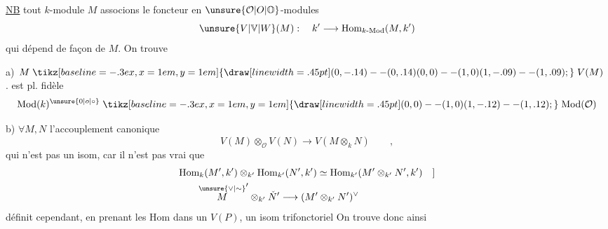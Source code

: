 
\uline{NB}  tout $k$-module $M$ associons le foncteur en $\unsure{\mathcal O|O|\mathbb O}$-modules
\[
 \unsure{V|\mathbb V|W}(M):\quad k'\longrightarrow\mathrm{Hom}_{k\text{-}\mathrm{Mod}}(M,k')
\]
qui dépend de façon  de $M$. On trouve

a) $M\mathrel{\tikz[baseline=-.3ex,x=1em,y=1em]{\draw[line width=.45pt] (0,-.14)--(0,.14) (0,0)--(1,0) (1,-.09)--(1,.09);}}V(M)$ . est pl. fidèle 
\[
 \mathrm{Mod}(k)^{\unsure{0|o|\circ}}\mathrel{\tikz[baseline=-.3ex,x=1em,y=1em]{\draw[line width=.45pt] (0,0)--(1,0) (1,-.12)--(1,.12);}}\mathrm{Mod}(\mathcal O)
\]

b) $\forall M,N$ \deleted{\unsure{$\xi$|:}} l'accouplement canonique
\[
 V(M)\otimes_{\mathcal O}V(N)\longrightarrow V(M\otimes_k N)\qquad,
\]
\unsure{(|[}qui n'est pas un isom, car il n'est pas vrai que
\[
\begin{aligned}
 &\mathrm{Hom}_{k}(M',k')\otimes_{k'}\mathrm{Hom}_{k'}(N',k')
 \simeq\mathrm{Hom}_{k'}(M'\otimes_{k'}N',k')\quad ]\\
 &\qquad \overset{\unsure{\vee|\sim}}{M}'\otimes_{k'}\check N'\longrightarrow(M'\otimes_{k'}N')^{\vee}
\end{aligned}
\]
définit cependant, en prenant les $\mathrm{Hom}$ dans  un $V(P)$, un isom trifonctoriel
On trouve donc ainsi

